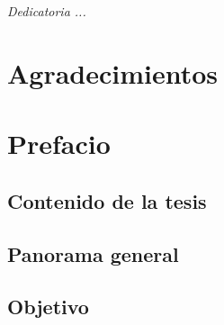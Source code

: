\chapter*{}
\begin{flushright}%
  \emph{Dedicatoria ...}
  \thispagestyle{empty}
\end{flushright}

\chapter{Agradecimientos}

\tableofcontents

\chapter{Prefacio}

\section*{Contenido de la tesis}
\section*{Panorama general}
\section*{Objetivo}
    